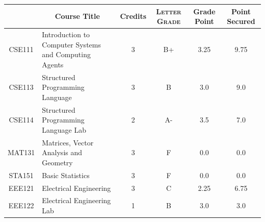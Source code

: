 \documentclass[11pt]{article}
\newcommand*{\numtwo}[1]{\pgfmathprintnumber[
                    fixed, precision=2, fixed zerofill=true]{#1}}
\begin{document}
                \begin{center}
                    \renewcommand{\arraystretch}{1.08}
                    
                \begin{tabular}{|c|l|c|>{\scshape}c|c|c|}
                \hline  \rule[-1ex]{0pt}{3.5ex} {\centering{\bf Course Code}} &  \multicolumn{1}{c|}{\textbf{Course Title}}  & {\bf Credits} & {\bf Letter Grade} & {\bf Grade Point} & {\bf Point Secured}  \\ 
                \hline   CSE111 &  Introduction to Computer Systems and Computing Agents		 & 3 & B+ & 3.25 & 9.75 \\ %
                \hline   CSE113 &  Structured Programming Language		 & 3 & B & 3.0 & 9.0 \\ %
                \hline   CSE114 &  Structured Programming Language Lab		 & 2 & A- & 3.5 & 7.0 \\ %
                \hline   MAT131 &  Matrices, Vector Analysis and Geometry		 & 3 & F & 0.0 & 0.0 \\ %
                \hline   STA151 &  Basic Statistics		 & 3 & F & 0.0 & 0.0 \\ %
                \hline   EEE121 &  Electrical Engineering		 & 3 & C & 2.25 & 6.75 \\ %
                \hline   EEE122 &  Electrical Engineering Lab		 & 1 & B & 3.0 & 3.0 \\ %

\hline                %
                \end{tabular}
                \end{center}
                \renewcommand{\arraystretch}{1.03}
\end{document}
